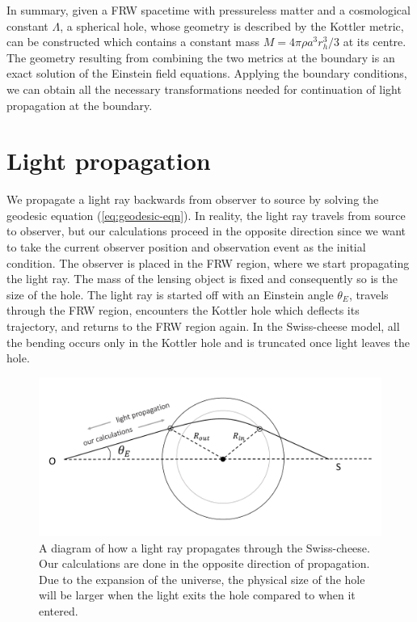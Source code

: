 In summary, given a FRW spacetime with pressureless matter and a cosmological constant $\Lambda$, a spherical hole, whose geometry is described by the Kottler metric, can be constructed which contains a constant mass $M = 4\pi \rho a^3 r_h^3/3$ at its centre. The geometry resulting from combining the two metrics at the boundary is an exact solution of the Einstein field equations. Applying the boundary conditions, we can obtain all the necessary transformations needed for continuation of light propagation at the boundary. 

\section{Light propagation}

We propagate a light ray backwards from observer to source by solving the geodesic equation (\autoref{eq:geodesic-eqn}). In reality, the light ray travels from source to observer, but our calculations proceed in the opposite direction since we want to take the current observer position and observation event as the initial condition. The observer is placed in the FRW region, where we start propagating the light ray. The mass of the lensing object is fixed and consequently so is the size of the hole. The light ray is started off with an Einstein angle $\theta_{E}$, travels through the FRW region, encounters the Kottler hole which deflects its trajectory, and returns to the FRW region again. In the Swiss-cheese model, all the bending occurs only in the Kottler hole and is truncated once light leaves the hole. 

\begin{figure}
  \centering
  \includegraphics[height=0.5\linewidth]{images/swiss-cheese-ray2-cropped.pdf}
  \caption{A diagram of how a light ray propagates through the Swiss-cheese. Our calculations are done in the opposite direction of propagation. Due to the expansion of the universe, the physical size of the hole will be larger when the light exits the hole compared to when it entered.}
  \label{fig:swiss-cheese-ray}
\end{figure}

